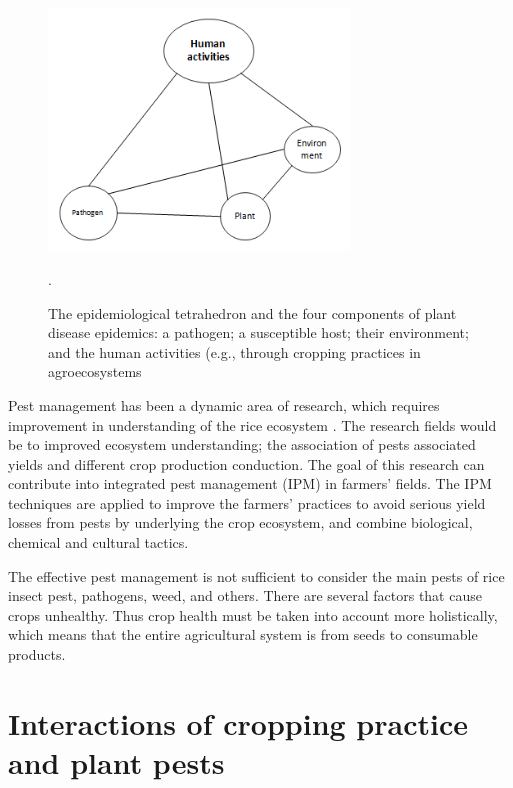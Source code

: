 \begin{figure}
\includegraphics[width=8cm]{distriangle}
\centering
\caption{The epidemiological tetrahedron and the four components of plant disease epidemics: a pathogen; a susceptible host; their environment; and the human activities (e.g., through cropping practices in agroecosystems}.
\label{fig:diseasetriangle}
\end{figure}

Pest management has been a dynamic area of research, which requires improvement in understanding of the rice ecosystem \citet{savary}. The research fields would be to improved ecosystem understanding; the association of pests associated yields and different crop production conduction. The goal of this research can contribute into integrated pest management (IPM) in farmers' fields. The IPM techniques are applied to improve the farmers' practices to avoid serious yield losses from pests by underlying the crop ecosystem, and combine biological, chemical and cultural tactics. 

The effective pest management is not sufficient to consider the main pests of rice insect pest, pathogens, weed, and others. There are several factors that cause crops unhealthy. Thus crop health must be taken into account more holistically, which means that the entire agricultural system is from seeds to consumable products. 

\section*{Interactions of cropping practice and plant pests}

